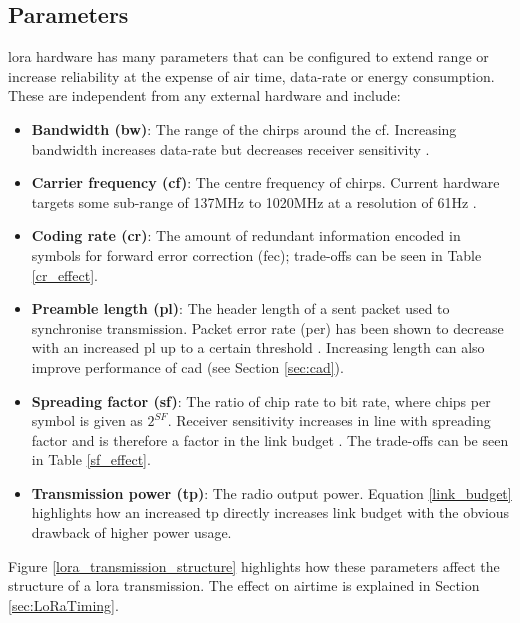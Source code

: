 \subsection{Parameters}
\ac{lora} hardware has many parameters that can be configured to extend range or increase reliability at the expense of air time, data-rate or energy consumption. These are independent from any external hardware and include:
\begin{itemize}
    \item \textbf{Bandwidth (\ac{bw})}: The range of the chirps around the \ac{cf}. Increasing bandwidth increases data-rate but decreases receiver sensitivity \cite{3YP:STUDY_OF_LORA}.
    \item \textbf{Carrier frequency (\ac{cf})}: The centre frequency of chirps. Current hardware targets some sub-range of 137MHz to 1020MHz at a resolution of 61Hz \cite{3YP:LORA_SX12}. 
    \item \textbf{Coding rate (\ac{cr})}: The amount of redundant information encoded in symbols for forward error correction (\ac{fec}); trade-offs can be seen in Table \ref{cr_effect}.
    \item \textbf{Preamble length (\ac{pl})}: The header length of a sent packet used to synchronise transmission. Packet error rate (\ac{per}) has been shown to decrease with an increased \ac{pl} up to a certain threshold \cite{3YP:LORA_PERFORMANCE}. Increasing length can also improve performance of \ac{cad} (see Section \ref{sec:cad}).
    \item \textbf{Spreading factor (\ac{sf})}: The ratio of chip rate to bit rate, where chips per symbol is given as $2^{SF}$. Receiver sensitivity increases in line with spreading factor and is therefore a factor in the link budget \cite{3YP:LORA_SX12}. The trade-offs can be seen in Table \ref{sf_effect}.
    \item \textbf{Transmission power (\ac{tp})}: The radio output power. Equation \ref{link_budget} highlights how an increased \ac{tp} directly increases link budget with the obvious drawback of higher power usage.
\end{itemize}
Figure \ref{lora_transmission_structure} highlights how these parameters affect the structure of a \ac{lora} transmission. The effect on airtime is explained in Section \ref{sec:LoRaTiming}.

